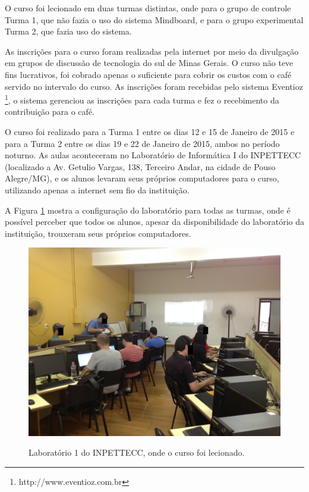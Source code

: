 O curso foi lecionado em duas turmas distintas, onde para o grupo de controle Turma 1, que não fazia o uso do sistema Mindboard, e para o grupo experimental Turma 2, que fazia uso do sistema.

As inscrições para o curso foram realizadas pela internet por meio da divulgação em grupos de discussão de tecnologia do sul de Minas Gerais. O curso não teve fins lucrativos, foi cobrado apenas o suficiente para cobrir os custos com o café servido no intervalo do curso. As inscrições foram recebidas pelo sistema Eventioz \footnote{http://www.eventioz.com.br}, o sistema gerenciou as inscrições para cada turma e fez o recebimento da contribuição para o café.

O curso foi realizado para a Turma 1 entre os dias 12 e 15 de Janeiro de 2015 e para a Turma 2 entre os dias 19 e 22 de Janeiro de 2015, ambos no período noturno.  As aulas aconteceram no Laboratório de Informática I do INPETTECC (localizado a Av. Getulio Vargas, 138, Terceiro Andar, na cidade de Pouso Alegre/MG), e os alunos levaram seus próprios computadores para o curso, utilizando apenas a internet sem fio da instituição.

A Figura \ref{fig:lab_1} mostra a configuração do laboratório para todas as turmas, onde é possível perceber que todos os alunos, apesar da disponibilidade do laboratório da instituição, trouxeram seus próprios computadores.

\begin{figure}[!h]
\centering
\caption{Laboratório 1 do INPETTECC, onde o curso foi lecionado.}
\includegraphics[width=1.0\textwidth]{imgs/lab_1.jpg}
\label{fig:lab_1} 
\end{figure}

